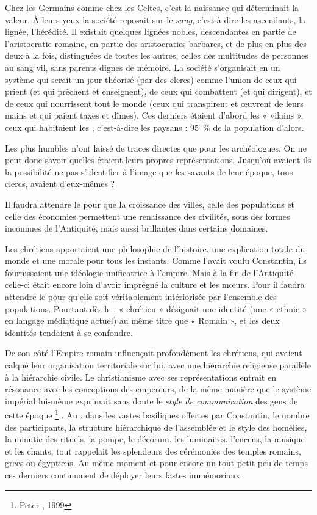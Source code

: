  Chez les Germains comme chez les Celtes, c'est la naissance qui déterminait la valeur. À leurs yeux la société reposait sur le \emph{sang}, c'est-à-dire les ascendants, la lignée, l'hérédité. Il existait quelques lignées nobles, descendantes en partie de l'aristocratie romaine, en partie des aristocraties barbares, et de plus en plus des deux à la fois, distinguées de toutes les autres, celles des multitudes de personnes au sang vil, sans parents dignes de mémoire. La société s'organisait en un système qui serait un jour théorisé (par des clercs) comme l'union de ceux qui prient (et qui prêchent et enseignent), de ceux qui combattent (et qui dirigent), et de ceux qui nourrissent tout le monde (ceux qui transpirent et œuvrent de leurs mains et qui paient taxes et dîmes). Ces derniers étaient d'abord les « vilains », ceux qui habitaient les , c'est-à-dire les paysans : 95~\% de la population d'alors.

 Les plus humbles n'ont laissé de traces directes que pour les archéologues. On ne peut donc savoir quelles étaient leurs propres représentations. Jusqu'où avaient-ils la possibilité ne pas s'identifier à l'image que les savants de leur époque, tous clercs, avaient d'eux-mêmes ?

 Il faudra attendre le  pour que la croissance des villes, celle des populations et celle des économies permettent une renaissance des civilités, sous des formes inconnues de l'Antiquité, mais aussi brillantes dans certains domaines. 
 
 Les chrétiens apportaient une philosophie de l'histoire, une explication totale du monde et une morale pour tous les instants. Comme l'avait voulu Constantin, ils fournissaient une idéologie unificatrice à l'empire. Mais à la fin de l'Antiquité celle-ci était encore loin d'avoir imprégné la culture et les mœurs. Pour  il faudra attendre le  pour qu'elle soit véritablement intériorisée par l'ensemble des populations. Pourtant dès le , « chrétien » désignait une identité (une « ethnie » en langage médiatique actuel) au même titre que « Romain », et les deux identités tendaient à se confondre. 

 De son côté l'Empire romain influençait profondément les chrétiens, qui avaient calqué leur organisation territoriale sur lui, avec une hiérarchie religieuse parallèle à la hiérarchie civile. Le christianisme avec ses représentations entrait en résonance avec les conceptions des empereurs, de la même manière que le système impérial lui-même exprimait sans doute le \emph{style de communication} des gens de cette époque%
\footnote{Peter , 1999}%
. Au , dans les vastes basiliques offertes par Constantin, le nombre des participants, la structure hiérarchique de l'assemblée et le style des homélies, la minutie des rituels, la pompe, le décorum, les luminaires, l'encens, la musique et les chants, tout rappelait les splendeurs des cérémonies des temples romains, grecs ou égyptiens. Au même moment et pour encore un tout petit peu de temps ces derniers continuaient de déployer leurs fastes immémoriaux. 

